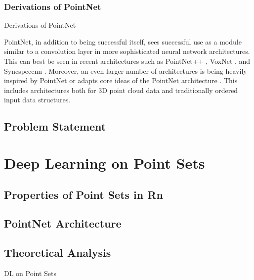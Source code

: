 
\subsubsection{Derivations of PointNet}

\begin{frame}[c]{Derivations of PointNet}

PointNet, in addition to being successful itself, sees successful use as a
module similar to a convolution layer in more sophisticated neural network
architectures.
This can best be seen in recent architectures such as PointNet++
\cite{qi2017pointnet++}, VoxNet \cite{maturana2015voxnet}, and Syncspeccnn
\cite{yi2017syncspeccnn}. Moreover, an even larger number of architectures is
being heavily inspired by PointNet or adapts core ideas of the PointNet
architecture \cite{jiang2018sift, wang2018sgpn, yu2018pu, gutierrez2018deep,
qi2018frustum, li2018pointcnn}. This includes architectures both for 3D point
cloud data and traditionally ordered input data structures.

\end{frame}



\subsection{Problem Statement}


\section{Deep Learning on Point Sets}

\subsection{Properties of Point Sets in Rn}

\subsection{PointNet Architecture}

\subsection{Theoretical Analysis}

\begin{frame}[c]{DL on Point Sets}

\end{frame}
